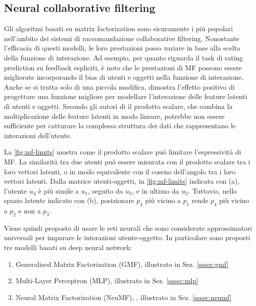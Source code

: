 \subsection{Neural collaborative filtering} \label{subsec:ncf}
Gli algoritmi basati su matrix factorization sono sicuramente i più popolari nell'ambito dei sistemi di raccomandazione collaborative filtering. Nonostante l'efficacia di questi modelli, le loro prestazioni  posso variare in base alla scelta della funzione di interazione. Ad esempio, per quanto riguarda il task di rating prediction su feedback espliciti, è noto che le prestazioni di MF possono essere migliorate incorporando il bias di utenti e oggetti nella funzione di interazione. Anche se si tratta solo di una piccola modifica, dimostra l'effetto positivo di progettare una funzione migliore per modellare l'interazione delle feature latenti di utenti e oggetti. 
Secondo gli autori di \cite{NCF} il prodotto scalare, che combina la moltiplicazione delle feature latenti in modo lineare, potrebbe non essere sufficiente per catturare la complessa struttura dei dati che rappresentano le interazioni dell'utente. 

La \autoref{fig:mf-limits} mostra come il prodotto scalare può limitare l'espressività di MF. La similarità tra due utenti può essere misurata con il prodotto scalare tra i loro vettori latenti, o in modo equivalente con il coseno dell'angolo tra i loro vettori latenti. Dalla matrice utenti-oggetti, in \autoref{fig:mf-limits} indicata con (a), l'utente $u_4$ è più simile a $u_1$, seguito da $u_3$, e in ultimo da $u_2$. Tuttavia, nello spazio latente indicato con (b), posizionare $p_4$ più vicino a $p_1$ rende $p_4$ più vicino a $p_2$ e non a $p_3$.

Viene quindi proposto di usare le reti neurali che sono considerate approssimatori universali \cite{NN-universal-approx} per imparare le interazioni utente-oggetto. In particolare sono proposti tre modelli basati su deep neural network:
\begin{enumerate}
 \item Generalized Matrix Factorization (GMF), illustrato in Sez. \ref{sssec:gmf} 
 \item Multi-Layer Perceptron (MLP), illustrato in Sez. \ref{sssec:mlp} 
 \item Neural Matrix Factorization (NeuMF), , illustrato in Sez. \ref{sssec:neumf} 
\end{enumerate}

